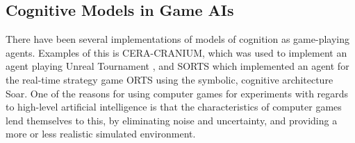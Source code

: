 \subsection{Cognitive Models in Game AIs}
There have been several implementations of models of cognition as game-playing agents. Examples of this is CERA-CRANIUM, which was used to implement an agent playing Unreal Tournament \cite{arrabales2009ceracranium}, and SORTS which implemented an agent for the real-time strategy game ORTS using the symbolic, cognitive architecture Soar.\cite{wintermute2007sorts} One of the reasons for using computer games for experiments with regards to high-level artificial intelligence is that the characteristics of computer games lend themselves to this, by eliminating noise and uncertainty, and providing a more or less realistic simulated environment.
